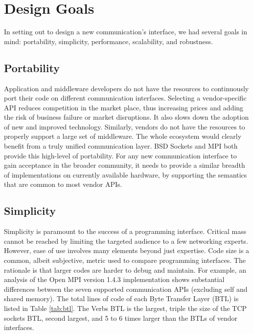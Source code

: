 \section{Design Goals}
\label{sec:design}

In setting out to design a new communication's interface, we had several goals 
in mind: portability, simplicity, performance, scalability, and robustness.

\subsection{Portability}
Application and middleware developers do not have the resources to continuously 
port their code on different communication interfaces. 
Selecting a vendor-specific API reduces competition in the market place, thus 
increasing prices and adding the risk of business failure or market disruptions. It 
also slows down the adoption of new and improved technology. 
Similarly, vendors do not have the resources to properly support a large set 
of middleware. The whole ecosystem would clearly benefit from a truly unified 
communication layer. 
BSD Sockets and MPI both provide this high-level of portability. 
For any new communication interface to gain acceptance in the broader 
community, it needs to provide a similar breadth of implementations on 
currently available hardware, by supporting the semantics that are common 
to most vendor APIs.

\subsection{Simplicity}
Simplicity is paramount to the success of a programming interface. Critical 
mass cannot be reached by limiting the targeted audience to a few networking 
experts. However, ease of use involves many elements beyond just expertise. 
Code size is a common, albeit subjective, metric used to compare programming 
interfaces. The rationale is that larger codes are harder to debug and 
maintain. For example, an analysis of the Open MPI version 1.4.3 implementation shows substantial
differences between the seven supported communication APIs (excluding self and 
shared memory). The total lines of code of each Byte Transfer Layer (BTL) is 
listed in Table \ref{tab:btl}. The Verbs BTL is the largest, triple the size 
of the TCP sockets BTL, second largest, and 5 to 6 times larger than the BTLs of 
vendor interfaces. 

